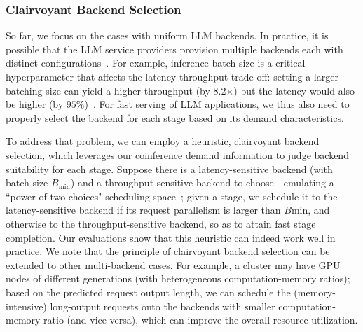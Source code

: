 

\subsubsection{Clairvoyant Backend Selection}
\label{subsubsec:selection}
So far, we focus on the cases with uniform LLM backends.
In practice, it is possible that the LLM service providers provision multiple backends each with distinct configurations~\cite{lin2024parrot}. %
For example, inference batch size is a critical hyperparameter that affects the latency-throughput trade-off: setting a larger batching size can yield a higher throughput (by 8.2$\times$) but the latency would also be higher (by $95\%$)~\cite{chen2023dissecting}.
For fast serving of LLM applications, we thus also need to properly select the backend for each stage based on its demand characteristics.

To address that problem, we can employ a heuristic, clairvoyant backend selection, which leverages our coinference demand information to judge backend suitability for each stage. 
Suppose there is a latency-sensitive backend (with batch size $B_\text{min}$) and a throughput-sensitive backend to choose---emulating a ``power-of-two-choices" scheduling space~\cite{sitaraman2001power}; given a stage, we schedule it to the latency-sensitive backend if its request parallelism is larger than $B\text{min}$, and otherwise to the throughput-sensitive backend, so as to attain fast stage completion. 
Our evaluations show that this heuristic can indeed work well in practice.
We note that the principle of clairvoyant backend selection can be extended to other multi-backend cases. 
For example, a cluster may have GPU nodes of different generations (with heterogeneous computation-memory ratios); based on the predicted request output length, we can schedule the (memory-intensive) long-output requests onto the backends with smaller computation-memory ratio (and vice versa), which can improve the overall resource utilization.


